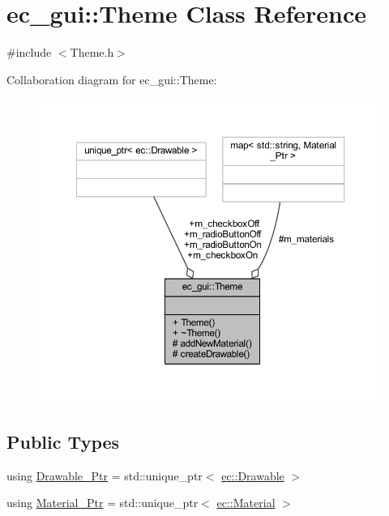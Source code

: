 \hypertarget{classec__gui_1_1_theme}{}\section{ec\+\_\+gui\+:\+:Theme Class Reference}
\label{classec__gui_1_1_theme}


{\ttfamily \#include $<$Theme.\+h$>$}



Collaboration diagram for ec\+\_\+gui\+:\+:Theme\+:\nopagebreak
\begin{figure}[H]
\begin{center}
\leavevmode
\includegraphics[width=350pt]{classec__gui_1_1_theme__coll__graph}
\end{center}
\end{figure}
\subsection*{Public Types}
\begin{DoxyCompactItemize}
\item 
using \mbox{\hyperlink{classec__gui_1_1_theme_aa831418117dca2cf1b0c390bd0da97c1}{Drawable\+\_\+\+Ptr}} = std\+::unique\+\_\+ptr$<$ \mbox{\hyperlink{classec_1_1_drawable}{ec\+::\+Drawable}} $>$
\item 
using \mbox{\hyperlink{classec__gui_1_1_theme_a11b77ff5a6cc1076926894595d564b96}{Material\+\_\+\+Ptr}} = std\+::unique\+\_\+ptr$<$ \mbox{\hyperlink{classec_1_1_material}{ec\+::\+Material}} $>$
\end{DoxyCompactItemize}
